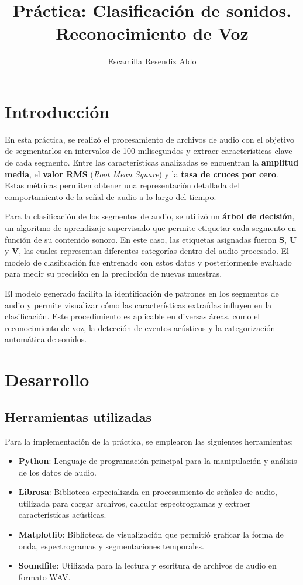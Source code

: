 \documentclass{report}
\title{\Huge{\textbf{Práctica: Clasificación de sonidos.}}\\
\Large{\textbf{Reconocimiento de Voz}}}
\author{Escamilla Resendiz Aldo}
\begin{document}
    \maketitle
    \tableofcontents
    \newpage
    \section{Introducción}

    En esta práctica, se realizó el procesamiento de archivos de audio con el objetivo de segmentarlos en intervalos de 100 milisegundos y extraer características clave de cada segmento. Entre las características analizadas se encuentran la \textbf{amplitud media}, el \textbf{valor RMS} (\textit{Root Mean Square}) y la \textbf{tasa de cruces por cero}. Estas métricas permiten obtener una representación detallada del comportamiento de la señal de audio a lo largo del tiempo.

    Para la clasificación de los segmentos de audio, se utilizó un \textbf{árbol de decisión}, un algoritmo de aprendizaje supervisado que permite etiquetar cada segmento en función de su contenido sonoro. En este caso, las etiquetas asignadas fueron \textbf{S}, \textbf{U} y \textbf{V}, las cuales representan diferentes categorías dentro del audio procesado. El modelo de clasificación fue entrenado con estos datos y posteriormente evaluado para medir su precisión en la predicción de nuevas muestras.

    El modelo generado facilita la identificación de patrones en los segmentos de audio y permite visualizar cómo las características extraídas influyen en la clasificación. Este procedimiento es aplicable en diversas áreas, como el reconocimiento de voz, la detección de eventos acústicos y la categorización automática de sonidos.
    \section{Desarrollo}

\subsection{Herramientas utilizadas}
Para la implementación de la práctica, se emplearon las siguientes herramientas:

\begin{itemize}
    \item \textbf{Python}: Lenguaje de programación principal para la manipulación y análisis de los datos de audio.
    \item \textbf{Librosa}: Biblioteca especializada en procesamiento de señales de audio, utilizada para cargar archivos, calcular espectrogramas y extraer características acústicas.
    \item \textbf{Matplotlib}: Biblioteca de visualización que permitió graficar la forma de onda, espectrogramas y segmentaciones temporales.
    \item \textbf{Soundfile}: Utilizada para la lectura y escritura de archivos de audio en formato WAV.
\end{itemize}
\end{document}
